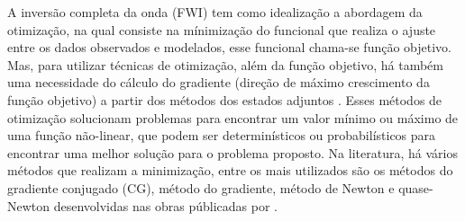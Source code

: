A inversão completa da onda (FWI) tem como idealização a abordagem da otimização, na qual consiste na mínimização do funcional que realiza o ajuste entre os dados observados e modelados, esse funcional chama-se função objetivo. Mas, para utilizar técnicas de otimização, além da função objetivo, há também  uma necessidade do cálculo do gradiente (direção de máximo crescimento da função objetivo) a partir dos métodos dos estados adjuntos \citep{plessix_2006, fichtner_2011, tarantola_2005}.  
Esses métodos de otimização solucionam problemas para encontrar um valor mínimo ou máximo de uma função não-linear, que podem ser determinísticos ou probabilísticos para encontrar uma melhor solução para o problema proposto. Na literatura, há vários métodos que realizam a minimização, entre os mais utilizados são os métodos do gradiente conjugado (CG), método do gradiente, método de Newton e quase-Newton desenvolvidas nas obras públicadas por \citep{nocedal_2006, nocedal_1980,al-baali_broydens_2013, polak_1965,hestenes_1952,fletcher_1964}. \\

